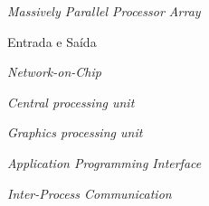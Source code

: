 
\begin{siglas}
    \item[\mppa] \textit{Massively Parallel Processor Array}
    \item[\io] Entrada e Saída
    \item[\noc] \textit{Network-on-Chip}
    \item[\cpu] \textit{Central processing unit}
    \item[\gpu] \textit{Graphics processing unit}
    \item[\api] \textit{Application Programming Interface}
    \item[\ipc] \textit{Inter-Process Communication}
\end{siglas}

